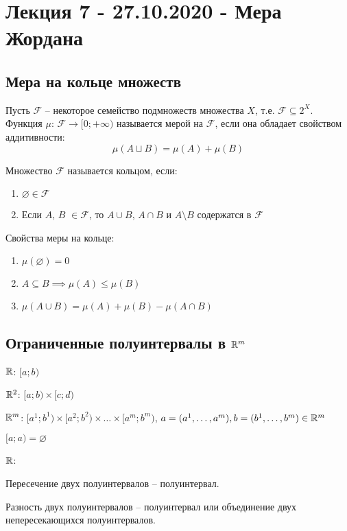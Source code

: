 \section{Лекция 7 - 27.10.2020 - Мера Жордана}
\subsection{Мера на кольце множеств}

\begin{definition}
    Пусть $\mathcal{F}$ -- некоторое семейство подмножеств множества $X$, т.е. $\mathcal{F} \subseteq 2^X$. Функция $\mu$: $\mathcal{F} \to [0; +\infty)$ называется
    мерой на $\mathcal{F}$, если она обладает свойством аддитивности:
    $$\mu(A \sqcup B) = \mu(A) + \mu(B)$$
\end{definition}

Множество $\mathcal{F}$ называется кольцом, если:
\begin{enumerate}
    \item $\varnothing \in \mathcal{F}$
    \item Если $A$, $B$ $\in \mathcal{F}$, то $A \cup B$, $A \cap B$ и $A \setminus B$ содержатся в $\mathcal{F}$
\end{enumerate}

Свойства меры на кольце:
\begin{enumerate}
    \item $\mu(\varnothing) = 0$
    \item $A \subseteq B \implies \mu(A) \leq \mu(B)$
    \item $\mu(A \cup B) = \mu(A) + \mu(B) - \mu(A \cap B)$
\end{enumerate}

\subsection{Ограниченные полуинтервалы в $\mathbb{R}^m$}

$\mathbb{R}$: $[a; b)$

$\mathbb{R}^2$: $[a; b) \times [c; d)$

$\mathbb{R}^m$: $[a^1; b^1) \times [a^2; b^2) \times \dots \times [a^m; b^m)$, $a = (a^1, \dots, a^m), b = (b^1, \dots, b^m) \in \mathbb{R}^m$

$[a; a) = \varnothing$


$\mathbb{R}$:

Пересечение двух полуинтервалов -- полуинтервал.

Разность двух полуинтервалов -- полуинтервал или объединение двух непересекающихся полуинтервалов.

